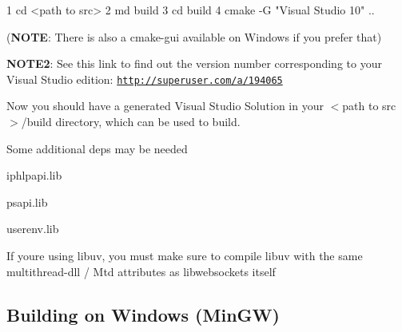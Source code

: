 \begin{DoxyCode}
1 cd <path to src>
2 md build
3 cd build
4 cmake -G "Visual Studio 10" ..
\end{DoxyCode}


({\bfseries N\+O\+TE}\+: There is also a cmake-\/gui available on Windows if you prefer that)

{\bfseries N\+O\+T\+E2}\+: See this link to find out the version number corresponding to your Visual Studio edition\+: \href{http://superuser.com/a/194065}{\tt http\+://superuser.\+com/a/194065}


\begin{DoxyEnumerate}
\item Now you should have a generated Visual Studio Solution in your {\ttfamily $<$path to src$>$/build} directory, which can be used to build.
\item Some additional deps may be needed
\begin{DoxyItemize}
\item iphlpapi.\+lib
\item psapi.\+lib
\item userenv.\+lib
\end{DoxyItemize}
\item If you\textquotesingle{}re using libuv, you must make sure to compile libuv with the same multithread-\/dll / Mtd attributes as libwebsockets itself
\end{DoxyEnumerate}

\subsection*{Building on Windows (Min\+GW) }


